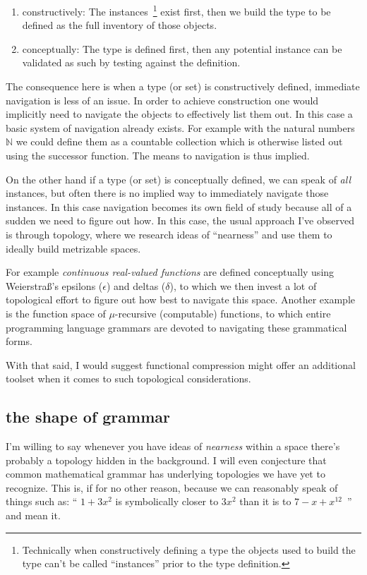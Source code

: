 \documentclass[twoside]{article}
\begin{document}
\begin{enumerate}
\item constructively: The instances\ \footnote{Technically when constructively defining a type the objects used to build
the type can't be called ``instances'' prior to the type definition.} exist first, then we build the type to be defined
as the full inventory of those objects.
\item conceptually: The type is defined first, then any potential instance can be validated as such by testing against
the definition.
\end{enumerate}

The consequence here is when a type (or set) is constructively defined, immediate navigation is less of an issue. In order
to achieve construction one would implicitly need to navigate the objects to effectively list them out. In this case a basic
system of navigation already exists. For example with the natural numbers $ \mathbb{N} $ we could define them as a countable
collection which is otherwise listed out using the successor function. The means to navigation is thus implied.

On the other hand if a type (or set) is conceptually defined, we can speak of \emph{all} instances, but often there is no
implied way to immediately navigate those instances. In this case navigation becomes its own field of study because all
of a sudden we need to figure out how. In this case, the usual approach I've observed is through topology,
where we research ideas of ``nearness'' and use them to ideally build metrizable spaces.

For example \emph{continuous real-valued functions} are defined conceptually using Weierstra\ss's epsilons ($ \epsilon $)
and deltas ($ \delta $), to which we then invest a lot of topological effort to figure out how best to navigate this
space. Another example is the function space of $ \mu $-recursive (computable) functions, to which entire programming
language grammars are devoted to navigating these grammatical forms.

With that said, I would suggest functional compression might offer an additional toolset when it comes to such
topological considerations.

\subsection*{the shape of grammar}

I'm willing to say whenever you have ideas of \emph{nearness} within a space there's probably a topology hidden
in the background. I will even conjecture that common mathematical grammar has underlying topologies we have yet
to recognize. This is, if for no other reason, because we can reasonably speak of things such as:
`` $ 1+3x^2 $ is symbolically closer to $ 3x^2 $ than it is to $ 7-x+x^{12} $~'' and mean it.
\end{document}
